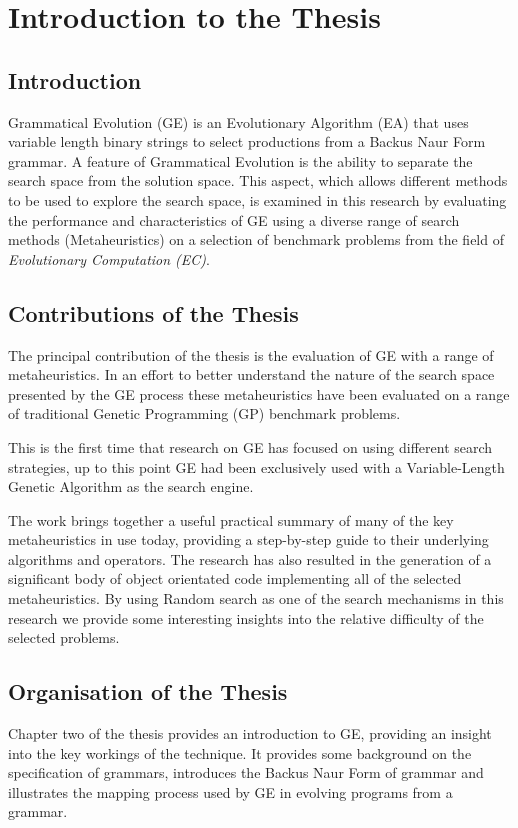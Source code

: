 \chapter{Introduction to the Thesis}
\section{Introduction}

Grammatical Evolution (GE) is an Evolutionary Algorithm (EA) that uses variable length binary strings to select productions from a Backus Naur Form grammar. A feature of Grammatical Evolution is the ability to separate the search space from the solution space. This aspect, which allows different methods to be used to explore the search space, is examined in this research by evaluating the performance and characteristics of GE using a diverse range of search methods (Metaheuristics) on a selection of benchmark problems from the field of \emph{Evolutionary Computation (EC)}.


\section{Contributions of the Thesis}
The principal contribution  of the thesis is the evaluation of GE with a range of metaheuristics. In an effort to better understand the nature of the search space presented by the GE process these metaheuristics have been evaluated on a range of traditional Genetic Programming (GP) benchmark problems.

This is the first time that research on GE has focused on using different search strategies, up to this point GE had been exclusively used with a Variable-Length Genetic Algorithm as the search engine.
 
The work brings together a useful practical summary of many of the key metaheuristics in use today, providing a step-by-step guide to their underlying algorithms and operators. The research has also resulted in the generation of a significant body of object orientated code implementing all of the selected  metaheuristics.
By using Random search as one of the search mechanisms in this research we provide some interesting insights into the relative difficulty of the selected problems.


\section{Organisation of the Thesis}
Chapter two of the thesis provides an introduction to GE, providing an insight into the key workings of the technique. It provides some background on the specification of grammars, introduces the Backus Naur Form of grammar and illustrates the mapping process used by GE in evolving programs from a grammar.

